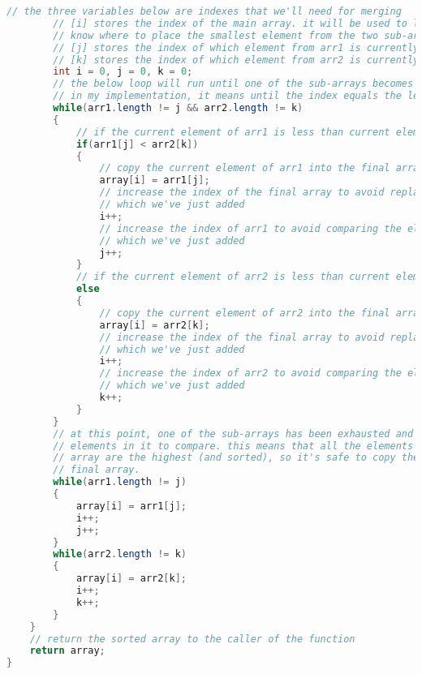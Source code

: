 \documentclass[main]{subfiles}
\begin{document}
\begin{lstlisting}[language=Java]
		// the three variables below are indexes that we'll need for merging
		// [i] stores the index of the main array. it will be used to let us
		// know where to place the smallest element from the two sub-arrays.
		// [j] stores the index of which element from arr1 is currently being compared
		// [k] stores the index of which element from arr2 is currently being compared
		int i = 0, j = 0, k = 0;
		// the below loop will run until one of the sub-arrays becomes empty
		// in my implementation, it means until the index equals the length of the sub-array
		while(arr1.length != j && arr2.length != k)
		{
			// if the current element of arr1 is less than current element of arr2
			if(arr1[j] < arr2[k])
			{
				// copy the current element of arr1 into the final array
				array[i] = arr1[j];
				// increase the index of the final array to avoid replacing the element
				// which we've just added
				i++;
				// increase the index of arr1 to avoid comparing the element
				// which we've just added
				j++;
			}
			// if the current element of arr2 is less than current element of arr1
			else
			{
				// copy the current element of arr2 into the final array
				array[i] = arr2[k];
				// increase the index of the final array to avoid replacing the element
				// which we've just added
				i++;
				// increase the index of arr2 to avoid comparing the element
				// which we've just added
				k++;
			}
		}
		// at this point, one of the sub-arrays has been exhausted and there are no more
		// elements in it to compare. this means that all the elements in the remaining
		// array are the highest (and sorted), so it's safe to copy them all into the
		// final array.
		while(arr1.length != j)
		{
			array[i] = arr1[j];
			i++;
			j++;
		}
		while(arr2.length != k)
		{
			array[i] = arr2[k];
			i++;
			k++;
		}
	}
	// return the sorted array to the caller of the function
	return array;
}
\end{lstlisting}
\end{document}

